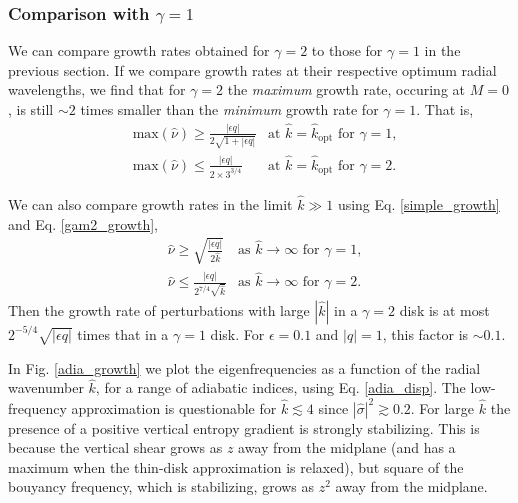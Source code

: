 \subsubsection{Comparison with $\gamma=1$}\label{adia_compare_gam1}
We can compare growth rates obtained for $\gamma=2$ to those for
$\gamma=1$ in the previous section. If we compare growth rates at their 
respective optimum radial wavelengths, we find
that for $\gamma=2$ the \emph{maximum} growth rate, occuring
at $M=0$, is still $\sim2$ times smaller than the \emph{minimum} growth
rate for $\gamma=1$. That is,
\begin{align}
  &\mathrm{max}(\hat{\nu}) \geq \frac{|\epsilon q|}{2\sqrt{1+|\epsilon
      q|}} & \text{at }\hat{k} = \hat{k}_\mathrm{opt} \text{ for }   \gamma=1,  \\
  &\mathrm{max}(\hat{\nu}) \leq \frac{|\epsilon q|}{2\times 3^{3/4}}
           & \text{at }\hat{k} = \hat{k}_\mathrm{opt} \text{ for } \gamma=2.
\end{align}

We can also compare growth rates in the limit $\hat{k}\gg1$ using
Eq. \ref{simple_growth} and Eq. \ref{gam2_growth},
\begin{align}
  &\hat{\nu} \geq \sqrt{\frac{|\epsilon q|}{2\hat{k}}}
  &  \text{as }  \hat{k}\to\infty  \text{ for }  \gamma=1, \\
  &\hat{\nu} \leq \frac{|\epsilon q|}{2^{7/4}\sqrt{\hat{k}}}
  &\text{as }  \hat{k}\to\infty  \text{ for }  \gamma=2.\label{gam2_growth_rate}
\end{align}
Then the growth rate of perturbations with large $|\hat{k}|$ in a
$\gamma=2$ disk is at most $2^{-5/4}\sqrt{|\epsilon q|}$ times that in a
$\gamma=1$ disk. For $\epsilon = 0.1$ and $|q|=1$, this factor is
$\sim 0.1$.  

In Fig. \ref{adia_growth} we plot the eigenfrequencies as a
function of the radial wavenumber $\hat{k}$, for a range of adiabatic
indices, using Eq. \ref{adia_disp}. The low-frequency approximation
is questionable for $\hat{k}\lesssim4$ since
$|\hat{\sigma}|^2\gtrsim0.2$. For large $\hat{k}$ the presence of a
positive vertical entropy gradient is strongly stabilizing. This is
because the vertical shear grows as $z$ away from the midplane (and
has a maximum when the thin-disk approximation is relaxed), but square
of the bouyancy frequency, which is stabilizing, grows as $z^2$ away
from the midplane. %

